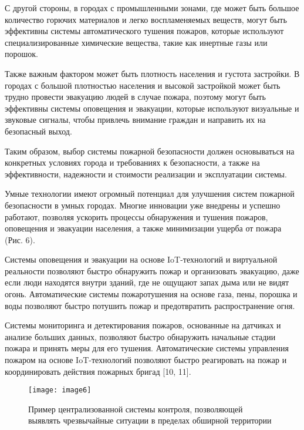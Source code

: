 \begin{multicols}{2}
С другой стороны, в городах с промышленными зонами, где может быть
большое количество горючих материалов и легко воспламеняемых веществ,
могут быть эффективны системы автоматического тушения пожаров, которые
используют специализированные химические вещества, такие как инертные
газы или порошок.

Также важным фактором может быть плотность населения и густота
застройки. В городах с большой плотностью населения и высокой застройкой
может быть трудно провести эвакуацию людей в случае пожара, поэтому
могут быть эффективны системы оповещения и эвакуации, которые используют
визуальные и звуковые сигналы, чтобы привлечь внимание граждан и
направить их на безопасный выход.

Таким образом, выбор системы пожарной безопасности должен основываться
на конкретных условиях города и требованиях к безопасности, а также на
эффективности, надежности и стоимости реализации и эксплуатации системы.

Умные технологии имеют огромный потенциал для улучшения систем пожарной
безопасности в умных городах. Многие инновации уже внедрены и успешно
работают, позволяя ускорить процессы обнаружения и тушения пожаров,
оповещения и эвакуации населения, а также минимизации ущерба от пожара
(Рис. 6).

Системы оповещения и эвакуации на основе IoT-технологий и виртуальной
реальности позволяют быстро обнаружить пожар и организовать эвакуацию,
даже если люди находятся внутри зданий, где не ощущают запах дыма или не
видят огонь. Автоматические системы пожаротушения на основе газа, пены,
порошка и воды позволяют быстро потушить пожар и предотвратить
распространение огня.

Системы мониторинга и детектирования пожаров, основанные на датчиках и
анализе больших данных, позволяют быстро обнаружить начальные стадии
пожара и принять меры для его тушения. Автоматические системы управления
пожаром на основе IoT-технологий позволяют быстро реагировать на пожар и
координировать действия пожарных бригад {[}10, 11{]}.

\end{multicols}

\begin{figure}[H]
  \centering
  \texttt{[image: image6]}
  \caption{Пример централизованной системы контроля, позволяющей выявлять
чрезвычайные ситуации в пределах обширной территории}
\end{figure}

